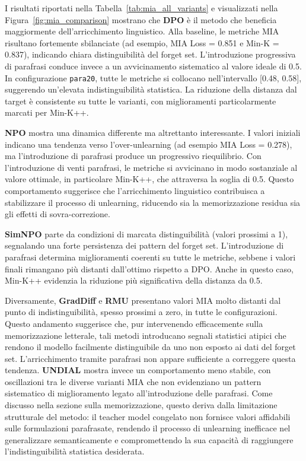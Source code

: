 I risultati riportati nella Tabella~\ref{tab:mia_all_variants} e visualizzati nella Figura~\ref{fig:mia_comparison} mostrano che \textbf{DPO} è il metodo che beneficia maggiormente dell’arricchimento linguistico. Alla baseline, le metriche MIA risultano fortemente sbilanciate (ad esempio, MIA Loss = 0.851 e Min-K = 0.837), indicando chiara distinguibilità del forget set. L’introduzione progressiva di parafrasi conduce invece a un avvicinamento sistematico al valore ideale di 0.5. In configurazione \texttt{para20}, tutte le metriche si collocano nell’intervallo [0.48, 0.58], suggerendo un’elevata indistinguibilità statistica. La riduzione della distanza dal target è consistente su tutte le varianti, con miglioramenti particolarmente marcati per Min-K++.

\textbf{NPO} mostra una dinamica differente ma altrettanto interessante. I valori iniziali indicano una tendenza verso l’over-unlearning (ad esempio MIA Loss = 0.278), ma l’introduzione di parafrasi produce un progressivo riequilibrio. Con l'introduzione di venti parafrasi, le metriche si avvicinano in modo sostanziale al valore ottimale, in particolare Min-K++, che attraversa la soglia di 0.5. Questo comportamento suggerisce che l’arricchimento linguistico contribuisca a stabilizzare il processo di unlearning, riducendo sia la memorizzazione residua sia gli effetti di sovra-correzione.

\textbf{SimNPO} parte da condizioni di marcata distinguibilità (valori prossimi a 1), segnalando una forte persistenza dei pattern del forget set. L’introduzione di parafrasi determina miglioramenti coerenti su tutte le metriche, sebbene i valori finali rimangano più distanti dall’ottimo rispetto a DPO. Anche in questo caso, Min-K++ evidenzia la riduzione più significativa della distanza da 0.5.

Diversamente, \textbf{GradDiff} e \textbf{RMU} presentano valori MIA molto distanti dal punto di indistinguibilità, spesso prossimi a zero, in tutte le configurazioni. Questo andamento suggerisce che, pur intervenendo efficacemente sulla memorizzazione letterale, tali metodi introducano segnali statistici atipici che rendono il modello facilmente distinguibile da uno non esposto ai dati del forget set. L’arricchimento tramite parafrasi non appare sufficiente a correggere questa tendenza.
\textbf{UNDIAL} mostra invece un comportamento meno stabile, con oscillazioni tra le diverse varianti MIA che non evidenziano un pattern sistematico di miglioramento legato all'introduzione delle parafrasi. Come discusso nella sezione sulla memorizzazione, questo deriva dalla limitazione strutturale del metodo: il teacher model congelato non fornisce valori affidabili sulle formulazioni parafrasate, rendendo il processo di unlearning inefficace nel generalizzare semanticamente e compromettendo la sua capacità di raggiungere l'indistinguibilità statistica desiderata.

